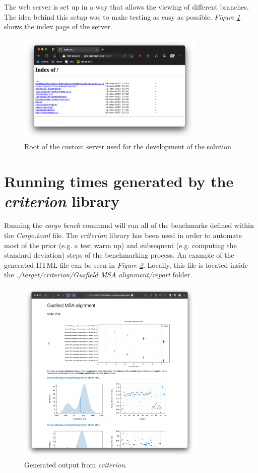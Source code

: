 \documentclass[twoside,openright,titlepage,numbers=noenddot,headinclude,%
                footinclude=true,cleardoublepage=empty,abstractoff, %
                BCOR=5mm,paper=a4,fontsize=11pt,%
                ngerman,american,%
                ]{scrreprt}
\begin{document}
The web server is set up in a way that allows the viewing of different branches. The idea behind this setup was to make testing as easy as possible. \textit{Figure \ref{fig:ci-branch-index}} shows the index page of the server.

\begin{figure}[h]
\includegraphics[width=0.8\textwidth]{ci-branch-index.png}
\centering
\caption{Root of the custom server used for the development of the solution.}
\label{fig:ci-branch-index}
\end{figure}

\FloatBarrier

\section{Running times generated by the \textit{criterion} library}
\label{sec:criterion}
Running the \textit{cargo bench} command will run all of the benchmarks defined within the \textit{Cargo.toml} file. The \textit{criterion} library has been used in order to automate most of the prior (e.g. a test warm up) and subsequent (e.g. computing the standard deviation) steps of the benchmarking process. An example of the generated HTML file can be seen in \textit{Figure \ref{fig:criterion}}. Locally, this file is located inside the \textit{./target/criterion/Gusfield MSA alignment/report} folder.

\begin{figure}[h]
\includegraphics[width=0.8\textwidth]{criterion.png}
\centering
\caption{Generated output from \textit{criterion}.}
\label{fig:criterion}
\end{figure}
\end{document}
